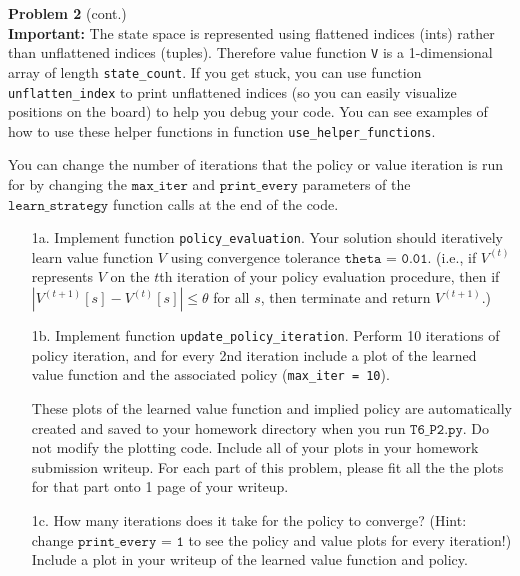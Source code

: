 \documentclass[submit]{harvardml}
\begin{document}
\begin{framed}
\textbf{Problem 2} (cont.)\\

\textbf{Important: } {The state space is represented using flattened indices (ints) rather than unflattened indices (tuples).  Therefore value function \texttt{V} is a 1-dimensional array of length \texttt{state\_count}.  If you get stuck, you can use function \texttt{unflatten\_index} to print unflattened indices (so you can easily visualize positions on the board) to help you debug your code.  You can see examples of how to use these helper functions in function \texttt{use\_helper\_functions}.} 


You can change the number of iterations that the policy or value iteration is run for by changing the $\texttt{max\_iter}$ and $\texttt{print\_every}$ parameters of the $\texttt{learn\_strategy}$ function calls at the end of the code.

\begin{itemize}
    \item[1a.]  Implement function \texttt{policy\_evaluation}.  Your
      solution should iteratively learn value function $V$ using
      convergence tolerance $\texttt{theta = 0.01}$.  (i.e., if
      $V^{(t)}$ represents $V$ on the $t$th iteration of your policy
      evaluation procedure, then if $|V^{(t + 1)}[s] - V^{(t)}[s]|
      \leq \theta$ for all $s$, then terminate and return $V^{(t + 1)}$.)

    \item[1b.] Implement function \texttt{update\_policy\_iteration}.
      Perform 10 iterations of policy iteration, and for every 2nd iteration include a plot of the learned value function and the associated policy (\texttt{max\_iter = 10}).  
    
    These plots of the learned value function and implied policy are
    automatically created and saved to your homework directory when
    you run $\texttt{T6\_P2.py}$.  Do not modify the plotting code.
    Include all of your plots in your homework submission writeup.  For
    each part of this problem, please fit all the the plots for that part onto 1 page of your writeup.
    
    \item [1c.] How many iterations does it take for the policy  to converge?  (Hint: change $\texttt{print\_every = 1}$ to see the policy and value plots for every iteration!)
Include a plot in your writeup of the learned value function and policy.
      

\end{itemize}
\end{framed}
\end{document}
